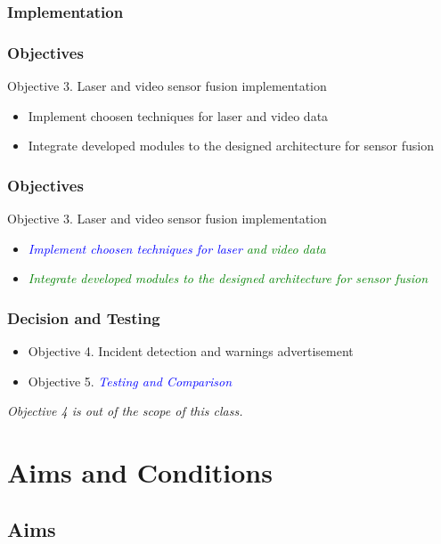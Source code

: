 \documentclass[table]{beamer}
\begin{document}
\subsubsection{Implementation}
\frame
{
	\frametitle{Objectives}
	Objective 3. Laser and video sensor fusion implementation
	\begin{itemize}	
		\item Implement choosen techniques for laser and video data
		\item Integrate developed modules to the designed architecture for sensor fusion
	\end{itemize}
}

\frame
{
	\frametitle{Objectives}
	Objective 3. Laser and video sensor fusion implementation
	\begin{itemize}	
		\item \textcolor{blue}{\emph{Implement choosen techniques for laser}}\textcolor{green}{\emph{ and video data}}
		\item \textcolor{green}{\emph{Integrate developed modules to the designed architecture for sensor fusion}}	
	\end{itemize}
}

\subsubsection{Decision and Testing}
\frame
{
	\begin{itemize}	
		\item Objective 4. Incident detection and warnings advertisement
		\item Objective 5. \textcolor{blue}{\emph{Testing and Comparison}}
	\end{itemize}
	
	\emph{Objective 4 is out of the scope of this class.}
}

\section{Aims and Conditions}
\subsection{Aims}
\end{document}
